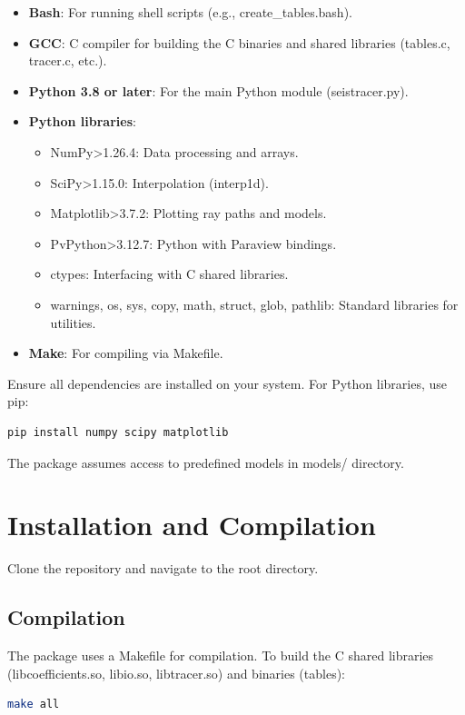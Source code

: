 \documentclass[12pt,a4paper]{article}
\begin{document}
\begin{itemize}
    \item \textbf{Bash}: For running shell scripts (e.g., create\_tables.bash).
    \item \textbf{GCC}: C compiler for building the C binaries and shared libraries (tables.c, tracer.c, etc.).
    \item \textbf{Python 3.8 or later}: For the main Python module (seistracer.py).
    \item \textbf{Python libraries}:
        \begin{itemize}
            \item NumPy>1.26.4: Data processing and arrays.
            \item SciPy>1.15.0: Interpolation (interp1d).
            \item Matplotlib>3.7.2: Plotting ray paths and models.
            \item PvPython>3.12.7: Python with Paraview bindings.
            \item ctypes: Interfacing with C shared libraries.
            \item warnings, os, sys, copy, math, struct, glob, pathlib: Standard libraries for utilities.
        \end{itemize}
    \item \textbf{Make}: For compiling via Makefile.
\end{itemize}

Ensure all dependencies are installed on your system. For Python libraries, use pip:

\begin{lstlisting}[language=Bash]
pip install numpy scipy matplotlib
\end{lstlisting}

The package assumes access to predefined models in models/ directory.

\section{Installation and Compilation}
Clone the repository and navigate to the root directory.
\subsection{Compilation}
The package uses a Makefile for compilation. To build the C shared libraries (libcoefficients.so, libio.so, libtracer.so) and binaries (tables):

\begin{lstlisting}[language=Bash]
make all
\end{lstlisting}
\end{document}
